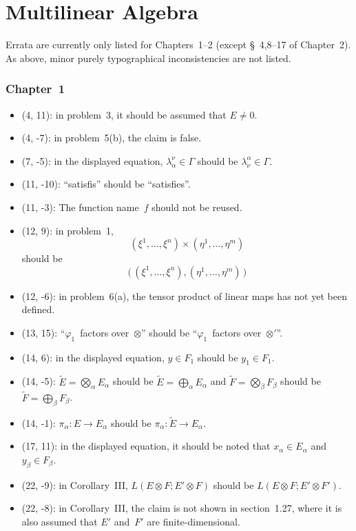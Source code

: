 \documentclass[letterpaper,12pt]{article}
\newcommand{\bigdsum}{\bigoplus}
\newcommand{\tprod}{\otimes}
\newcommand{\bigtprod}{\bigotimes}
\begin{document}
\newpage
\part*{Multilinear Algebra}
Errata are currently only listed for Chapters~1--2 (except \S~4,8--17 of Chapter~2). As above, minor purely typographical inconsistencies are not listed.

\section*{Chapter~1}
\begin{itemize}
\item (4, 11): in problem~3, it should be assumed that \(E\ne 0\).
\item (4, -7): in problem~5(b), the claim is false.
\item (7, -5): in the displayed equation, \(\lambda^{\nu}_{\alpha}\in\Gamma\) should be \(\lambda^{\alpha}_{\nu}\in\Gamma\).
\item (11, -10): ``satisfis'' should be ``satisfies''.
\item (11, -3): The function name~\(f\) should not be reused.
\item (12, 9): in problem~1,
\[(\xi^1,\ldots,\xi^n)\times(\eta^1,\ldots,\eta^m)\]
should be
\[\bigl(\,(\xi^1,\ldots,\xi^n),(\eta^1,\ldots,\eta^m)\,\bigr)\]
\item (12, -6): in problem~6(a), the tensor product of linear maps has not yet been defined.
\item (13, 15): ``\(\varphi_1\)~factors over~\(\tprod\)'' should be ``\(\varphi_1\)~factors over~\(\tprod'\)''.
\item (14, 6): in the displayed equation, \(y\in F_1\) should be \(y_1\in F_1\).
\item (14, -5): \(\widetilde{E}=\bigtprod_{\alpha}E_{\alpha}\) should be \(\widetilde{E}=\bigdsum_{\alpha}E_{\alpha}\) and \(\widetilde{F}=\bigtprod_{\beta}F_{\beta}\) should be \(\widetilde{F}=\bigdsum_{\beta}F_{\beta}\).
\item (14, -1): \(\pi_{\alpha}:E\to E_{\alpha}\) should be \(\pi_{\alpha}:\widetilde{E}\to E_{\alpha}\).
\item (17, 11): in the displayed equation, it should be noted that \(x_{\alpha}\in E_{\alpha}\) and \(y_{\beta}\in F_{\beta}\).
\item (22, -9): in Corollary~III, \(L(E\tprod F;E'\tprod F)\) should be \(L(E\tprod F;E'\tprod F')\).
\item (22, -8): in Corollary~III, the claim is not shown in section~1.27, where it is also assumed that \(E'\) and~\(F'\) are finite-dimensional.

\end{itemize}
\end{document}
